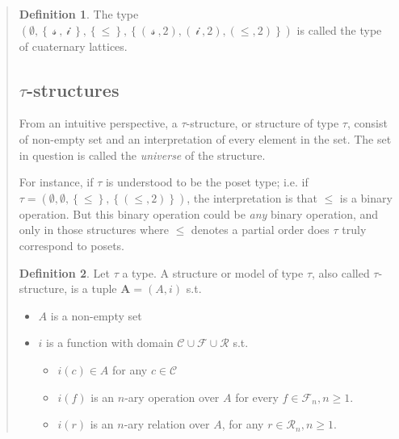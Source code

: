 \documentclass[a4paper, 12pt]{article}
\theoremstyle{definition}
\theoremstyle{definition}
\theoremstyle{definition}
\newtheorem{definition}{Definition}
\begin{document}
\begin{quote}
\begin{definition}
    The type $\left( \emptyset, \left\{ ~\mathcal{s}~, ~\mathcal{i}~ \right\}, \left\{ \leq \right\}, \left\{ (~\mathcal{s}~, 2), (~\mathcal{i}~, 2), (\leq, 2) \right\}    \right) $ is called the type of cuaternary lattices.
\end{definition}

\subsection{$\tau$-structures}

From an intuitive perspective, a $\tau$-structure, or structure of type $\tau$,
consist of non-empty set and an interpretation of every element in the 
set. The set in question is called the \textit{universe} of the structure. 

For instance, if $\tau$ is understood to be the poset type; i.e. if $\tau =
\left( \emptyset, \emptyset, \left\{ \leq \right\}, \left\{ (\leq, 2) \right\}
\right) $, the interpretation is that $\leq$ is a binary operation. But this
binary operation could be \textit{any} binary operation, and only 
in those structures where $\leq$ denotes a partial order does $\tau$
truly correspond to posets.

\begin{definition}
    Let $\tau$ a type. A structure or model of type $\tau$, also called 
    $\tau$-structure, is a tuple $\textbf{A} = (A, i)$ s.t.

    \begin{itemize}
        \item $A$ is a non-empty set 
        \item $i$ is a function with domain $\mathcal{C} \cup \mathcal{F} \cup \mathcal{R}$
            s.t. 
            \begin{itemize}
                \item $i(c) \in A$ for any $c \in \mathcal{C}$
                \item $i(f)$ is an $n$-ary operation over $A$ for every 
                    $f \in \mathcal{F}_n, n \geq 1$.
                \item $i(r)$ is an $n$-ary relation over $A$, for any 
                    $r \in \mathcal{R}_n, n \geq 1$.
            \end{itemize}
    \end{itemize}
\end{definition}


\end{quote}
\end{document}
